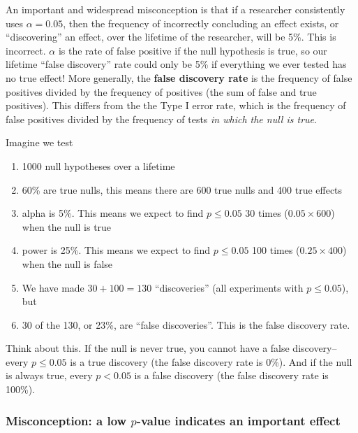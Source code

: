 \documentclass[]{book}
\providecommand{\tightlist}{%
  \setlength{\itemsep}{0pt}\setlength{\parskip}{0pt}}
\begin{document}
An important and widespread misconception is that if a researcher consistently uses \(\alpha=0.05\), then the frequency of incorrectly concluding an effect exists, or ``discovering'' an effect, over the lifetime of the researcher, will be 5\%. This is incorrect. \(\alpha\) is the rate of false positive if the null hypothesis is true, so our lifetime ``false discovery'' rate could only be 5\% if everything we ever tested has no true effect! More generally, the \textbf{false discovery rate} is the frequency of false positives divided by the frequency of positives (the sum of false and true positives). This differs from the the Type I error rate, which is the frequency of false positives divided by the frequency of tests \emph{in which the null is true}.

Imagine we test

\begin{enumerate}
\def\labelenumi{\arabic{enumi}.}
\tightlist
\item
  1000 null hypotheses over a lifetime
\item
  60\% are true nulls, this means there are 600 true nulls and 400 true effects
\item
  alpha is 5\%. This means we expect to find \(p \le 0.05\) 30 times (\(0.05 \times 600\)) when the null is true
\item
  power is 25\%. This means we expect to find \(p \le 0.05\) 100 times (\(0.25 \times 400\)) when the null is false
\item
  We have made \(30 + 100=130\) ``discoveries'' (all experiments with \(p \le 0.05\)), but
\item
  30 of the 130, or 23\%, are ``false discoveries''. This is the false discovery rate.
\end{enumerate}

Think about this. If the null is never true, you cannot have a false discovery--every \(p \le 0.05\) is a true discovery (the false discovery rate is 0\%). And if the null is always true, every \(p < 0.05\) is a false discovery (the false discovery rate is 100\%).

\hypertarget{misconception-a-low-p-value-indicates-an-important-effect}{%
\subsubsection{\texorpdfstring{Misconception: a low \(p\)-value indicates an important effect}{Misconception: a low p-value indicates an important effect}}\label{misconception-a-low-p-value-indicates-an-important-effect}}
\end{document}
